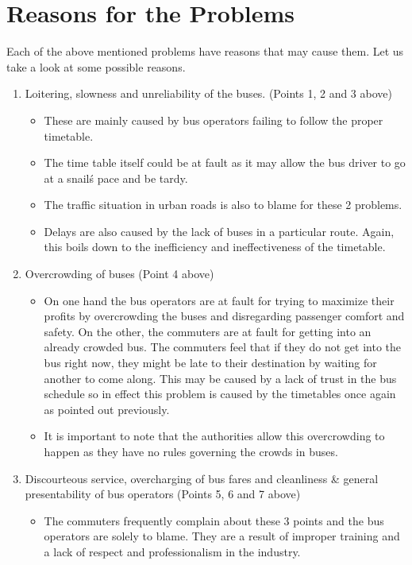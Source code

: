 \section{Reasons for the Problems}
Each of the above mentioned problems have reasons that may cause them. Let us take a look at some possible reasons.
\begin {enumerate}
\item Loitering, slowness and unreliability of the buses. (Points 1, 2 and 3 above)
\begin {itemize}
\item These are mainly caused by bus operators failing to follow the proper timetable.
\item The time table itself could be at fault as it may allow the bus driver to go at a snail\'s pace and be tardy.
\item The traffic situation in urban roads is also to blame for these 2 problems.
\item Delays are also caused by the lack of buses in a particular route. Again, this boils down to the inefficiency and ineffectiveness of the timetable.
\end {itemize}
\item Overcrowding of buses (Point 4 above)
\begin {itemize}
\item On one hand the bus operators are at fault for trying to maximize their profits by overcrowding the buses and disregarding passenger comfort and safety. On the other, the commuters are at fault for getting into an already crowded bus. The commuters feel that if they do not get into the bus right now, they might be late to their destination by waiting for another to come along. This may be caused by a lack of trust in the bus schedule so in effect this problem is caused by the timetables once again as pointed out previously.
\item It is important to note that the authorities allow this overcrowding to happen as they have no rules governing the crowds in buses.
\end {itemize}
\item Discourteous service, overcharging of bus fares and cleanliness \& general presentability of bus operators (Points 5, 6 and 7 above)
\begin {itemize}
\item The commuters frequently complain about these 3 points and the bus operators are solely to blame. They are a result of improper training and a lack of respect and professionalism in the industry.

\end{itemize}
\end{enumerate}
